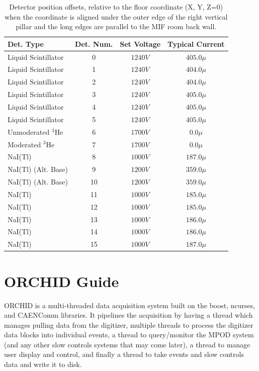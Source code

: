 \documentclass[onecolumn, 10pt, letterpaper, twoside]{article}
\newcommand{\nuc}[2] {$^{#1}$#2}
\begin{document}
\begin{table}[hb!]
\caption{Detector position offsets, relative to the floor coordinate (X, Y, Z=0) when the coordinate is aligned under the outer edge of the right vertical pillar and the long edges are parallel to the MIF room back wall.\label{tab:DANG-Power-Information}}
\begin{center}
\begin{tabular}{|l|c|c|c|}
\hline
Det. Type & Det. Num. & Set Voltage & Typical Current \\
\hline
\hline
Liquid Scintillator & 0 & $1240V$ & $405.0\mu{}$ \\
Liquid Scintillator & 1 & $1240V$ & $404.0\mu{}$ \\
Liquid Scintillator & 2 & $1240V$ & $404.0\mu{}$ \\
Liquid Scintillator & 3 & $1240V$ & $405.0\mu{}$ \\
Liquid Scintillator & 4 & $1240V$ & $405.0\mu{}$ \\
Liquid Scintillator & 5 & $1240V$ & $405.0\mu{}$ \\
Unmoderated \nuc{3}{He} & 6 & $1700V$ & $0.0\mu{}$ \\
Moderated \nuc{3}{He}& 7 & $1700V$ & $0.0\mu{}$ \\
NaI(Tl) & 8 & $1000V$ & $187.0\mu{}$ \\
NaI(Tl) (Alt. Base) & 9 & $1200V$ & $359.0\mu{}$ \\
NaI(Tl) (Alt. Base) & 10 & $1200V$ & $359.0\mu{}$ \\
NaI(Tl) & 11 & $1000V$ & $185.0\mu{}$ \\
NaI(Tl) & 12 & $1000V$ & $185.0\mu{}$ \\
NaI(Tl) & 13 & $1000V$ & $186.0\mu{}$ \\
NaI(Tl) & 14 & $1000V$ & $186.0\mu{}$ \\
NaI(Tl) & 15 & $1000V$ & $187.0\mu{}$ \\
\hline
\end{tabular}
\end{center}
\end{table}

\clearpage
\section{ORCHID Guide}
ORCHID is a multi-threaded data acquisition system built on the boost, ncurses, and CAENComm libraries. It pipelines the acquisition by having a thread which manages pulling data from the digitizer, multiple threads to process the digitizer data blocks into individual events, a thread to query/monitor the MPOD system (and any other slow controls systems that may come later), a thread to manage user display and control, and finally a thread to take events and slow controls data and write it to disk.
\end{document}
